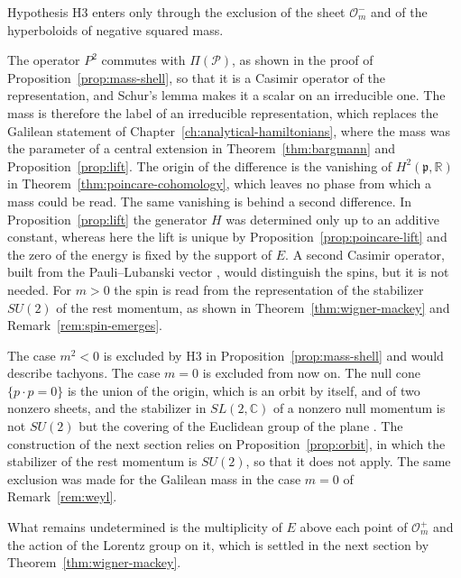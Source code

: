 \noindent Hypothesis H3 enters only through the exclusion of the sheet $\mathcal{O}_m^-$ and of the hyperboloids of negative squared mass.

\begin{remark}\label{rem:casimir-label}
	The operator $P^2$ commutes with $\Pi(\mathcal{P})$, as shown in the proof of Proposition~\ref{prop:mass-shell}, so that it is a Casimir operator of the representation, and Schur's lemma makes it a scalar on an irreducible one. The mass is therefore the label of an irreducible representation, which replaces the Galilean statement of Chapter~\ref{ch:analytical-hamiltonians}, where the mass was the parameter of a central extension in Theorem~\ref{thm:bargmann} and Proposition~\ref{prop:lift}. The origin of the difference is the vanishing of $H^2(\mathfrak{p},\mathbb{R})$ in Theorem~\ref{thm:poincare-cohomology}, which leaves no phase from which a mass could be read. The same vanishing is behind a second difference. In Proposition~\ref{prop:lift} the generator $H$ was determined only up to an additive constant, whereas here the lift is unique by Proposition~\ref{prop:poincare-lift} and the zero of the energy is fixed by the support of $E$. A second Casimir operator, built from the Pauli--Lubanski vector \cite[TODO-location]{TODO-BarutRaczka}, would distinguish the spins, but it is not needed. For $m>0$ the spin is read from the representation of the stabilizer $SU(2)$ of the rest momentum, as shown in Theorem~\ref{thm:wigner-mackey} and Remark~\ref{rem:spin-emerges}.
\end{remark}

\begin{remark}[The cases $m^2<0$ and $m=0$]\label{rem:massless}
	The case $m^2<0$ is excluded by H3 in Proposition~\ref{prop:mass-shell} and would describe tachyons. The case $m=0$ is excluded from now on. The null cone $\{p\cdot p=0\}$ is the union of the origin, which is an orbit by itself, and of two nonzero sheets, and the stabilizer in $SL(2,\mathbb{C})$ of a nonzero null momentum is not $SU(2)$ but the covering of the Euclidean group of the plane \cite[TODO-location]{TODO-BarutRaczka}. The construction of the next section relies on Proposition~\ref{prop:orbit}, in which the stabilizer of the rest momentum is $SU(2)$, so that it does not apply. The same exclusion was made for the Galilean mass in the case $m=0$ of Remark~\ref{rem:weyl}.
\end{remark}

\noindent What remains undetermined is the multiplicity of $E$ above each point of $\mathcal{O}_m^+$ and the action of the Lorentz group on it, which is settled in the next section by Theorem~\ref{thm:wigner-mackey}.

